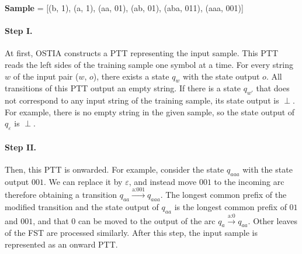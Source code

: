 \textbf{Sample} = {[}(b, 1), (a, 1), (aa, 01), (ab, 01), (aba, 011), (aaa, 001){]}


\paragraph{Step I.}

At first, OSTIA constructs a PTT representing the input sample.
This PTT reads the left sides of the training sample one symbol at a time.
For every string $w$ of the input pair ($w$, $o$), there exists a state $q_w$ with the state output $o$.
All transitions of this PTT output an empty string.
If there is a state $q_{w'}$ that does not correspond to any input string of the training sample, its state output is $\perp$.
For example, there is no empty string in the given sample, so the state output of $q_\varepsilon$ is $\perp$.

\begin{center}
\end{center}

\paragraph{Step II.}

Then, this PTT is onwarded.
For example, consider the state $q_{aaa}$ with the state output $001$.
We can replace it by $\varepsilon$, and instead move $001$ to the incoming arc therefore obtaining a transition $q_{aa}\xrightarrow{\text{a:001}}q_{aaa}$.
The longest common prefix of the modified transition and the state output of $q_{aa}$ is the longest common prefix of $01$ and $001$, and that $0$ can be moved to the output of the arc $q_{a}\xrightarrow{\text{a:0}}q_{aa}$.
Other leaves of the FST are processed similarly.
After this step, the input sample is represented as an onward PTT.

